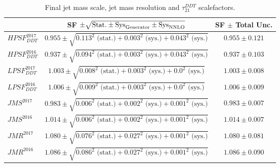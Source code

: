  \begin{table}[htbp]
    \centering
     \begin{tabular}{|l|c|c|}
     \hline
      & SF $\pm \sqrt{\textrm{Stat.} \pm \textrm{Sys}_{\rm{Generator}} \pm \textrm{Sys}_{\rm{NNLO}}}$ & SF $\pm$ Total Unc. \\
    \hline
    $HPSF_{DDT}^{2017}$ &  $0.955 \pm \sqrt{0.113^2 \textrm{ (stat.)} + 0.003^2 \textrm{ (sys.)} + 0.043^2 \textrm{ (sys.)}}$  & $0.955 \pm 0.121$\\
    $HPSF_{DDT}^{2016}$ &  $0.937 \pm \sqrt{0.094^2 \textrm{ (stat.)} + 0.003^2 \textrm{ (sys.)} + 0.043^2 \textrm{ (sys.)}}$  & $0.937 \pm 0.103$\\
  \hline
    $LPSF_{DDT}^{2017}$ &  $1.003 \pm \sqrt{0.008^2 \textrm{ (stat.)} + 0.003^2 \textrm{ (sys.)} + 0.0^2 \textrm{ (sys.)}}$  & $1.003 \pm 0.008$\\
    $LPSF_{DDT}^{2016}$ &  $1.006 \pm \sqrt{0.009^2 \textrm{ (stat.)} + 0.003^2 \textrm{ (sys.)} + 0.0^2 \textrm{ (sys.)}}$  & $1.006 \pm 0.009$\\
     \hline
    $JMS^{2017}     $ &  $0.983 \pm \sqrt{0.006^2 \textrm{ (stat.)} + 0.002^2 \textrm{ (sys.)} + 0.001^2 \textrm{ (sys.)}}$ & $0.983 \pm 0.007$\\
    $JMS^{2016}     $ &  $1.014 \pm \sqrt{0.006^2 \textrm{ (stat.)} + 0.002^2 \textrm{ (sys.)} + 0.001^2 \textrm{ (sys.)}}$ & $1.014 \pm 0.007$\\
    \hline
    $JMR^{2017}     $ &  $1.080 \pm \sqrt{0.076^2 \textrm{ (stat.)} + 0.027^2 \textrm{ (sys.)} + 0.001^2 \textrm{ (sys.)}}$ & $1.080 \pm 0.081$\\
    $JMR^{2016}     $ &  $1.086 \pm \sqrt{0.086^2 \textrm{ (stat.)} + 0.027^2 \textrm{ (sys.)} + 0.001^2 \textrm{ (sys.)}}$ & $1.086 \pm 0.090$\\
    \hline
    \end{tabular}
       \caption{Final jet mass scale, jet mass resolution and $\tau_{21}^{DDT}$ scalefactors.}
       \label{tab:wsf_total}
    \end{table}

\clearpage    
